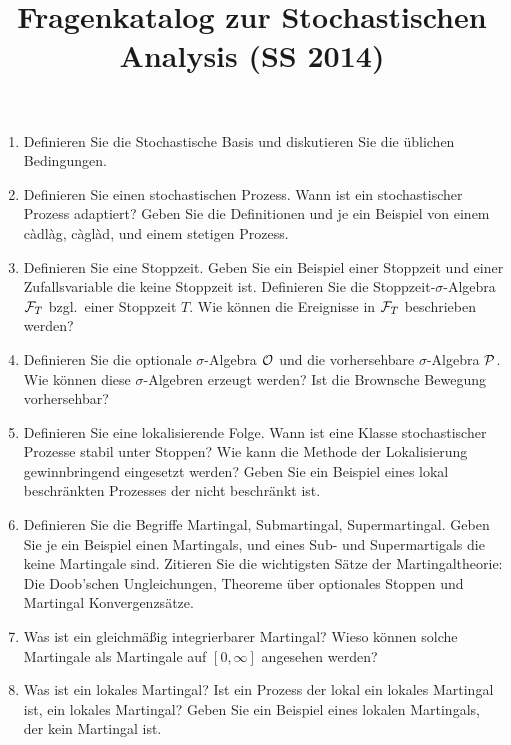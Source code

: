 \documentclass[11pt,oneside]{amsart}
\title{Fragenkatalog zur Stochastischen Analysis (SS 2014)}
\begin{document}
\maketitle

\begin{enumerate}
    \item Definieren Sie die Stochastische Basis und diskutieren Sie die
        üblichen Bedingungen.
    \item Definieren Sie einen stochastischen Prozess. Wann ist ein
        stochastischer Prozess adaptiert? Geben Sie die Definitionen und je ein
        Beispiel von einem c\`adl\`ag, c\`agl\`ad, und einem stetigen Prozess.
    \item Definieren Sie eine Stoppzeit. Geben Sie ein Beispiel einer Stoppzeit
        und einer Zufallsvariable die keine Stoppzeit ist. Definieren Sie die
        Stoppzeit-$\sigma$-Algebra $\mathcal F_{T}$ bzgl.\ einer Stoppzeit $T$. Wie
        können die Ereignisse in $\mathcal F_{T}$ beschrieben werden?
    \item Definieren Sie die optionale $\sigma$-Algebra $\mathcal O$ und die
        vorhersehbare $\sigma$-Algebra $\mathcal P$. Wie können diese
        $\sigma$-Algebren erzeugt werden? Ist die Brownsche Bewegung
        vorhersehbar?
    \item Definieren Sie eine lokalisierende Folge. Wann ist eine Klasse
        stochastischer Prozesse stabil unter Stoppen? Wie kann die Methode der
        Lokalisierung gewinnbringend eingesetzt werden? Geben Sie ein Beispiel
        eines lokal beschränkten Prozesses der nicht beschränkt ist. 

    \item Definieren Sie die Begriffe Martingal, Submartingal, Supermartingal.
        Geben Sie je ein Beispiel einen Martingals, und eines Sub- und
        Supermartigals die keine Martingale sind. Zitieren Sie die wichtigsten 
        Sätze der Martingaltheorie: Die Doob'schen Ungleichungen, Theoreme
        über optionales Stoppen und Martingal Konvergenzsätze.

    \item Was ist ein gleichmäßig integrierbarer Martingal? Wieso können solche
        Martingale als Martingale auf $[0,\infty ]$ angesehen werden?

    \item Was ist ein lokales Martingal? Ist ein Prozess der lokal ein lokales
        Martingal ist, ein lokales Martingal? Geben Sie ein Beispiel eines
        lokalen Martingals, der kein Martingal ist.


\end{enumerate}
\end{document}
